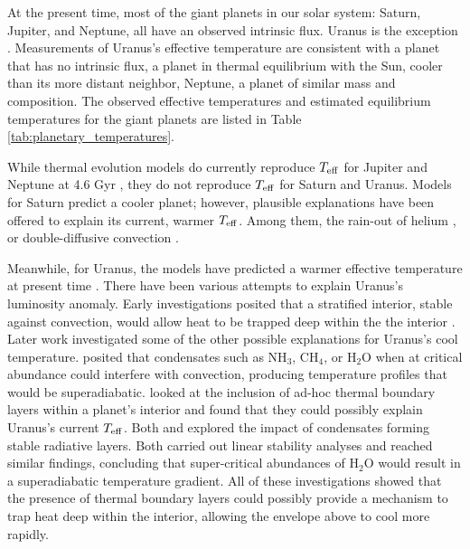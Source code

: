 \documentclass[11pt]{ucscthesisbs}
\begin{document}
At the present time, most of the giant planets in our solar system: Saturn, Jupiter, and Neptune, all have an observed intrinsic flux. Uranus is the exception \citep{pearl_conrath_1991}. Measurements of Uranus's effective temperature are consistent with a planet that has no intrinsic flux, a planet in thermal equilibrium with the Sun, cooler than its more distant neighbor, Neptune, a planet of similar mass and composition. The observed effective temperatures and estimated equilibrium temperatures for the giant planets are listed in Table \ref{tab:planetary_temperatures}. 

While thermal evolution models do currently reproduce $T_{\rm eff}$ for Jupiter and Neptune at 4.6 Gyr \citep{graboske_1975,fortney_2011}, they do not reproduce $T_{\rm eff}$ for Saturn and Uranus. Models for Saturn predict a cooler planet; however, plausible explanations have been offered to explain its current, warmer $T_{\rm eff}$. Among them, the rain-out of helium \citep{fortney_hubbard_2003, mankovich_2020}, or double-diffusive convection \citep{leconte_chabrier_2013}. 

Meanwhile, for Uranus, the models have predicted a warmer effective temperature at present time \citep{fortney_2011, podolak_1991, hubbard_1995, scheibe_2019}. There have been various attempts to explain Uranus's luminosity anomaly. Early investigations posited that a stratified interior, stable against convection, would allow heat to be trapped deep within the the interior \citep{podolak_1991}. Later work investigated some of the other possible explanations for Uranus's cool temperature. \citep{guillot_1995} posited that condensates such as NH$_{3}$, CH$_{4}$, or H$_{2}$O when at critical abundance could interfere with convection, producing temperature profiles that would be superadiabatic. \citep{nettelmann_2016} looked at the inclusion of ad-hoc thermal boundary layers within a planet's interior and found that they could possibly explain Uranus's current $T_{\rm eff}$. Both \citep{friedson_2017} and \citep{leconte_2017} explored the impact of condensates forming stable radiative layers. Both carried out linear stability analyses and reached similar findings, concluding that super-critical abundances of H$_{2}$O would result in a superadiabatic temperature gradient. All of these investigations showed that the presence of thermal boundary layers could possibly provide a mechanism to trap heat deep within the interior, allowing the envelope above to cool more rapidly.
\end{document}
